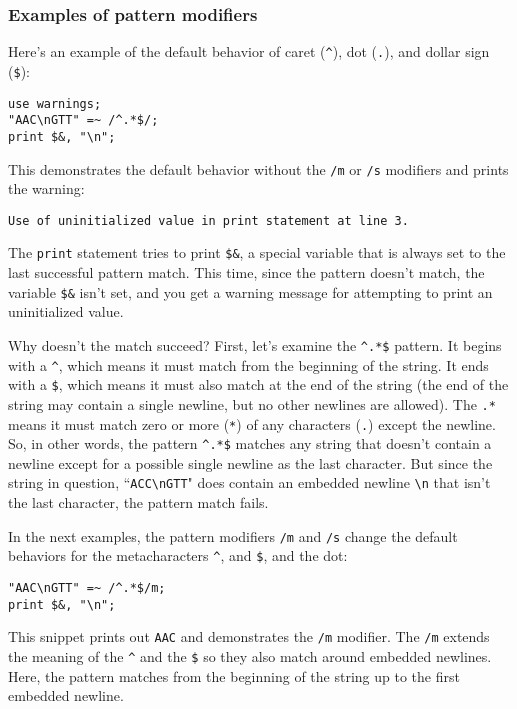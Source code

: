 \subsubsection{Examples of pattern modifiers}
Here's an example of the default behavior of caret (\verb|^|), dot (\verb|.|), and dollar sign (\verb|$|):

\begin{lstlisting}
use warnings;
"AAC\nGTT" =~ /^.*$/;
print $&, "\n";
\end{lstlisting}

This demonstrates the default behavior without the \verb|/m| or \verb|/s| modifiers and prints the warning:

\begin{lstlisting}
Use of uninitialized value in print statement at line 3.
\end{lstlisting}

The \verb|print| statement tries to print \verb|$&|, a special variable that is always set to the last successful pattern match. This time, since the pattern doesn't match, the variable \verb|$&| isn't set, and you get a warning message for attempting to print an uninitialized value.

Why doesn't the match succeed? First, let's examine the \verb|^.*$| pattern. It begins with a \verb|^|, which means it must match from the beginning of the string. It ends with a \verb|$|, which means it must also match at the end of the string (the end of the string may contain a single newline, but no other newlines are allowed). The \verb|.*| means it must match zero or more (\verb|*|) of any characters (\verb|.|) except the newline. So, in other words, the pattern \verb|^.*$| matches any string that doesn't contain a newline except for a possible single newline as the last character. But since the string in question, ``\verb|ACC\nGTT|" does contain an embedded newline \verb|\n| that isn't the last character, the pattern match fails.

In the next examples, the pattern modifiers \verb|/m| and \verb|/s| change the default behaviors for the metacharacters \verb|^|, and \verb|$|, and the dot:

\begin{lstlisting}
"AAC\nGTT" =~ /^.*$/m;
print $&, "\n";
\end{lstlisting}

This snippet prints out \verb|AAC| and demonstrates the \verb|/m| modifier. The \verb|/m| extends the meaning of the \verb|^| and the \verb|$| so they also match around embedded newlines. Here, the pattern matches from the beginning of the string up to the first embedded newline.


